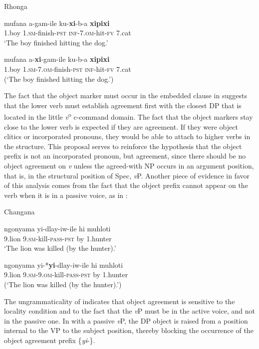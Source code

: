 \documentclass[output=paper]{langsci/langscibook}
\begin{document}
{Rhonga}

\ea
\gll mufana         a-gam-ile                ku-\textbf{xi}{}-b-a                   \textbf{xipixi}\\
     1.boy           1.\textsc{sm}{}-finish-\textsc{pst}        \textsc{inf}{}-7.\textsc{om}{}-hit-\textsc{fv}        7.cat\\
\glt ‘The boy finished hitting the dog.’
\z

\ea
\gll *mufana       a-\textbf{xi}{}-gam-ile                      ku-b-a            \textbf{xipixi}\\
     1.boy           \textsc{1.sm-7.om}{}-finish-\textsc{pst}         \textsc{inf}{}-hit-\textsc{fv}      7.cat\\
\glt (‘The boy finished hitting the dog.’)
\z

The fact that the object marker must occur in the embedded clause in  suggests that the lower verb must establish agreement first with the closest DP that is located in the little {\textit{v}}{\textsuperscript{o}} c-command domain. The fact that the object markers stay close to the lower verb is expected if they are agreement. If they were object clitics or incorporated pronouns, they would be able to attach to higher verbs in the structure. This proposal serves to reinforce the hypothesis that the object prefix is not an incorporated pronoun, but agreement, since there should be no object agreement on {\textit{v}} unless the agreed-with NP occurs in an argument position, that is, in the structural position of  Spec, {\textit{v}}P. Another piece of evidence in favor of this analysis comes from the fact that the object prefix cannot appear on the verb when it is in a passive voice, as in :

{Changana}

\ea
\gll ngonyama            yi-dlay-iw-ile               hi      muhloti\\
     9.lion                   9.\textsc{sm}{}-kill-\textsc{pass}{}-\textsc{pst}       by     1.hunter\\
\glt ‘The lion was killed (by the hunter).’
\z

\ea
\gll *ngonyama          yi-*\textbf{yi}{}-dlay-iw-ile                  hi       muhloti\\
     9.lion                   9.\textsc{sm-9.om}{}-kill-\textsc{pass-pst}       by      1.hunter\\
\glt (‘The lion was killed (by the hunter).’)
\z

The ungrammaticality of  indicates that object agreement is sensitive to the locality condition and to the fact that the {\textit{v}}P must be in the active voice, and not in the passive one. In  with a passive {\textit{v}}P, the DP object is raised from a position internal to the VP to the subject position, thereby blocking the occurrence of the object agreement prefix \{{\textit{yi}}{}-\}.
\end{document}
